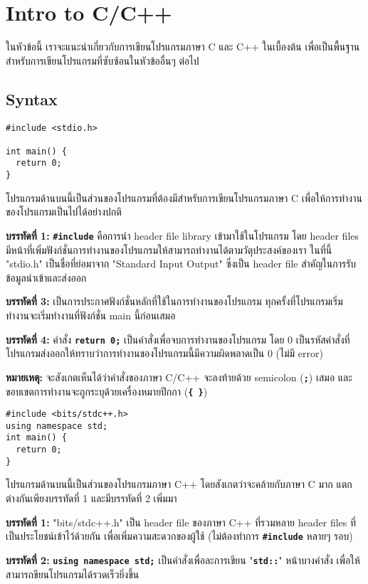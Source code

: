 \chapter{Intro to C/C++}
ในหัวข้อนี้ เราจะแนะนำเกี่ยวกับการเขียนโปรแกรมภาษา C และ C++ ในเบื้องต้น เพื่อเป็นพื้นฐานสำหรับการเขียนโปรแกรมที่ซับซ้อนในหัวข้ออื่นๆ ต่อไป
\section{Syntax}
\begin{lstlisting}
#include <stdio.h>

int main() {
  return 0;
}
\end{lstlisting}
โปรแกรมด้านบนนี้เป็นส่วนของโปรแกรมที่ต้องมีสำหรับการเขียนโปรแกรมภาษา C เพื่อให้การทำงานของโปรแกรมเป็นไปได้อย่างปกติ

\textbf{บรรทัดที่ 1:} \textbf{\texttt{\#include}} คือการนำ header file library  เข้ามาใช้ในโปรแกรม โดย header files มีหน้าที่เพิ่มฟังก์ชั่นการทำงานของโปรแกรมให้สามารถทำงานได้ตามวัตุประสงค์ของเรา ในที่นี้ "stdio.h" เป็นชื่อที่ย่อมาจาก "Standard Input Output" ซึ่งเป็น header file สำคัญในการรับข้อมูลนำเข้าและส่งออก

\textbf{บรรทัดที่ 3:} เป็นการประกาศฟังก์ชั่นหลักที่ใช้ในการทำงานของโปรแกรม ทุกครั้งที่โปรแกรมเริ่มทำงานจะเริ่มทำงานที่ฟังก์ชั่น main นี้ก่อนเสมอ

\textbf{บรรทัดที่ 4:} คำสั่ง \textbf{\texttt{return 0;}} เป็นคำสั่งเพื่อจบการทำงานของโปรแกรม โดย 0 เป็นรหัสคำสั่งที่โปรแกรมส่งออกให้ทราบว่าการทำงานของโปรแกรมนี้มีความผิดพลาดเป็น 0 (ไม่มี error)

\noindent\textbf{หมายเหตุ:} จะสังเกตเห็นได้ว่าคำสั่งของภาษา C/C++ จะลงท้ายด้วย semicolon (\textbf{\texttt{;}}) เสมอ และขอบเขตการทำงานจะถูกระบุด้วยเครื่องหมายปีกกา (\textbf{\texttt{\{ \}}})

\newpage
\begin{lstlisting}
#include <bits/stdc++.h>
using namespace std;
int main() {
  return 0;
}
\end{lstlisting}
โปรแกรมด้านบนนี้เป็นส่วนของโปรแกรมภาษา C++ โดยสังเกตว่าจะคล้ายกับภาษา C มาก แตกต่างกันเพียงบรรทัดที่ 1 และมีบรรทัดที่ 2 เพิ่มมา

\textbf{บรรทัดที่ 1:} "bits/stdc++.h" เป็น header file ของภาษา C++ ที่รวมหลาย header files ที่เป็นประโยชน์เข้าไว้ด้วยกัน เพื่อเพิ่มความสะดวกของผู้ใช้ (ไม่ต้องทำการ \textbf{\texttt{\#include}} หลายๆ รอบ)

\textbf{บรรทัดที่ 2:} \textbf{\texttt{using namespace std;}} เป็นคำสั่งเพื่อละการเขียน "\textbf{\texttt{std::}}" หน้าบางคำสั่ง เพื่อให้สามารถขียนโปรแกรมได้รวดเร็วยิ่งขึ้น

